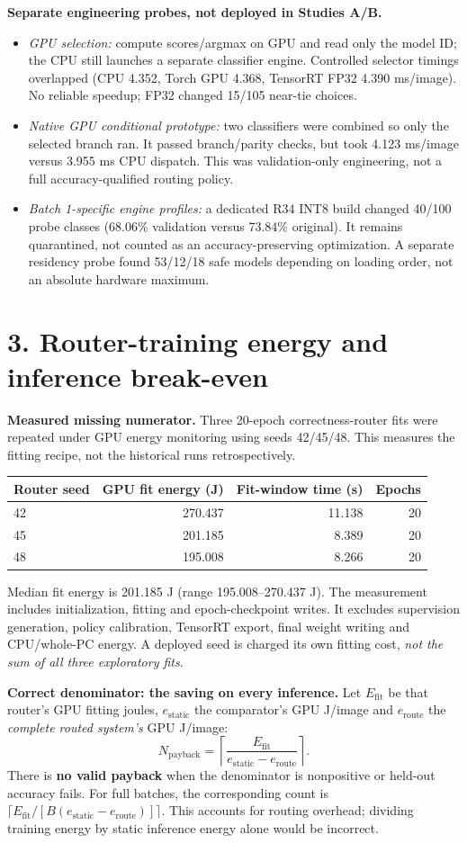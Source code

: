 \documentclass[10pt,a4paper]{article}
\newcommand{\heading}[1]{\section*{\color{navy}#1}}
\begin{document}
\textbf{Separate engineering probes, not deployed in Studies A/B.}
\begin{itemize}
\item \emph{GPU selection:} compute scores/argmax on GPU and read only the model ID; the CPU still launches a separate classifier engine. Controlled selector timings overlapped (CPU 4.352, Torch GPU 4.368, TensorRT FP32 4.390 ms/image). No reliable speedup; FP32 changed 15/105 near-tie choices.
\item \emph{Native GPU conditional prototype:} two classifiers were combined so only the selected branch ran. It passed branch/parity checks, but took 4.123 ms/image versus 3.955 ms CPU dispatch. This was validation-only engineering, not a full accuracy-qualified routing policy.
\item \emph{Batch 1-specific engine profiles:} a dedicated R34 INT8 build changed 40/100 probe classes (68.06\% validation versus 73.84\% original). It remains quarantined, not counted as an accuracy-preserving optimization. A separate residency probe found 53/12/18 safe models depending on loading order, not an absolute hardware maximum.
\end{itemize}

\newpage
\heading{3. Router-training energy and inference break-even}
\textbf{Measured missing numerator.} Three 20-epoch correctness-router fits were repeated under GPU energy monitoring using seeds 42/45/48. This measures the fitting recipe, not the historical runs retrospectively.
\begin{center}\small
\begin{tabular}{@{}lrrr@{}}\toprule
Router seed & GPU fit energy (J) & Fit-window time (s) & Epochs\\\midrule
42&270.437&11.138&20\\45&201.185&8.389&20\\48&195.008&8.266&20\\\bottomrule
\end{tabular}
\end{center}
Median fit energy is 201.185 J (range 195.008--270.437 J). The measurement includes initialization, fitting and epoch-checkpoint writes. It excludes supervision generation, policy calibration, TensorRT export, final weight writing and CPU/whole-PC energy. A deployed seed is charged its own fitting cost, \emph{not the sum of all three exploratory fits}.

\textbf{Correct denominator: the saving on every inference.} Let $E_{\mathrm{fit}}$ be that router's GPU fitting joules, $e_{\mathrm{static}}$ the comparator's GPU J/image and $e_{\mathrm{route}}$ the \emph{complete routed system's} GPU J/image:
\[
N_{\mathrm{payback}}=\left\lceil\frac{E_{\mathrm{fit}}}{e_{\mathrm{static}}-e_{\mathrm{route}}}\right\rceil .
\]
There is \textbf{no valid payback} when the denominator is nonpositive or held-out accuracy fails. For full batches, the corresponding count is
$\lceil E_{\mathrm{fit}}/[B(e_{\mathrm{static}}-e_{\mathrm{route}})]\rceil$.
This accounts for routing overhead; dividing training energy by static inference energy alone would be incorrect.
\end{document}
